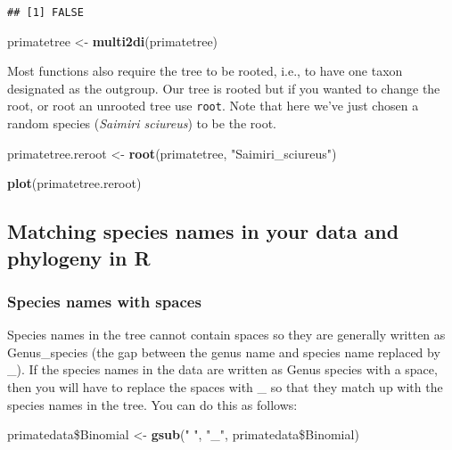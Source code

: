 \documentclass[11pt]{article}
\newcommand{\KeywordTok}[1]{\textcolor[rgb]{0.13,0.29,0.53}{\textbf{{#1}}}}
\newcommand{\StringTok}[1]{\textcolor[rgb]{0.31,0.60,0.02}{{#1}}}
\newcommand{\NormalTok}[1]{{#1}}
\begin{document}
\begin{verbatim}
## [1] FALSE
\end{verbatim}

\begin{snugshade}
\begin{Highlighting}[]
\NormalTok{primatetree <-}\StringTok{ }\KeywordTok{multi2di}\NormalTok{(primatetree)}
\end{Highlighting}
\end{snugshade}

Most functions also require the tree to be rooted, i.e., to have one taxon designated as the outgroup. Our tree is rooted but if you wanted to change the root, or root an unrooted tree use \texttt{root}. Note that here we've just chosen a random species (\textit{Saimiri sciureus}) to be the root.

\begin{snugshade}
\begin{Highlighting}[]
\NormalTok{primatetree.reroot <-}\StringTok{ }\KeywordTok{root}\NormalTok{(primatetree, }\StringTok{"Saimiri_sciureus"}\NormalTok{)  }

\KeywordTok{plot}\NormalTok{(primatetree.reroot)}
\end{Highlighting}
\end{snugshade}

\subsection{Matching species names in your data and phylogeny in R}

\subsubsection{Species names with spaces} 
\label{spaces}
Species names in the tree cannot contain spaces so they are generally written as Genus\_species (the gap between the genus name and species name replaced by \_). If the species names in the data are written as Genus species with a space, then you will have to replace the spaces with \_ so that they match up with the species names in the tree. You can do this as follows:

\begin{snugshade}
\begin{Highlighting}[]
\NormalTok{primatedata\$Binomial <-}\StringTok{ }\KeywordTok{gsub}\NormalTok{(}\StringTok{" "}\NormalTok{, }\StringTok{"_"}\NormalTok{, primatedata\$Binomial)}
\end{Highlighting}
\end{snugshade}
\end{document}
